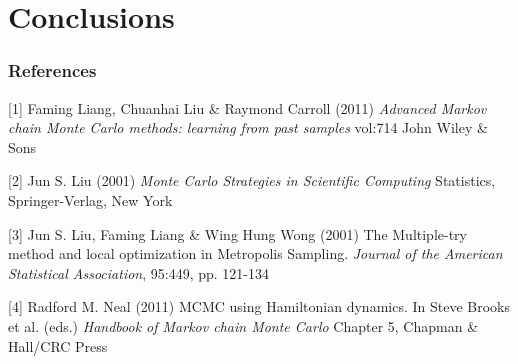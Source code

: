 \documentclass{article} %
\begin{document}
\section{Conclusions}


\subsubsection*{References}


\small{
[1] Faming Liang, Chuanhai Liu \& Raymond Carroll (2011) {\it Advanced Markov chain Monte Carlo methods: learning from past samples} vol:714 John Wiley \& Sons

[2] Jun S. Liu (2001) {\it Monte Carlo Strategies in Scientific Computing} Statistics, Springer-Verlag, New York

[3] Jun S. Liu, Faming Liang \& Wing Hung Wong (2001) The Multiple-try method and local optimization in Metropolis Sampling. {\it Journal of the American Statistical Association}, 95:449, pp. 121-134

[4] Radford M. Neal (2011) MCMC using Hamiltonian dynamics. In Steve Brooks et al. (eds.) {\it Handbook of Markov chain Monte Carlo} Chapter 5, Chapman \& Hall/CRC Press
}
\end{document}

